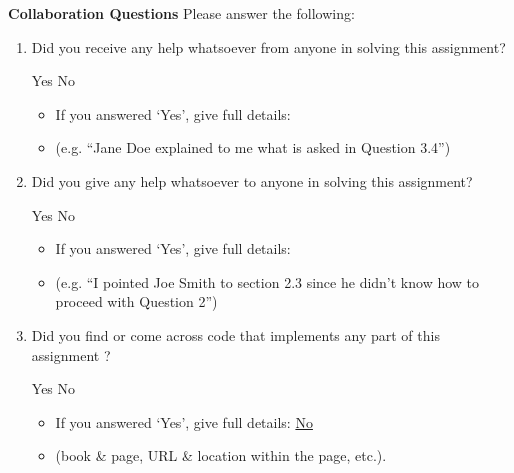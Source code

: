 \documentclass[11pt,addpoints,answers]{exam}
\numberwithin{equation}{section} %
\numberwithin{figure}{section} %
\numberwithin{table}{section} %
\begin{document}
\clearpage

\textbf{Collaboration Questions} Please answer the following:

\begin{enumerate}
    \item Did you receive any help whatsoever from anyone in solving this assignment?
    \begin{checkboxes}
     \choice Yes
     \CorrectChoice No
    \end{checkboxes}
    \begin{itemize}
        \item If you answered `Yes', give full details:
        \item (e.g. “Jane Doe explained to me what is asked in Question 3.4”)
    \end{itemize}

    \begin{tcolorbox}[fit,height=3cm,blank, borderline={1pt}{-2pt},nobeforeafter]
    \end{tcolorbox}

    \item Did you give any help whatsoever to anyone in solving this assignment?
    \begin{checkboxes}
     \choice Yes
     \CorrectChoice No
    \end{checkboxes}
    \begin{itemize}
        \item If you answered `Yes', give full details:
        \item (e.g. “I pointed Joe Smith to section 2.3 since he didn’t know how to proceed with Question 2”)
    \end{itemize}

    \begin{tcolorbox}[fit,height=3cm,blank, borderline={1pt}{-2pt},nobeforeafter]
    \end{tcolorbox}

    \item Did you find or come across code that implements any part of this assignment ? 
    \begin{checkboxes}
     \choice Yes
     \CorrectChoice No
    \end{checkboxes}
    \begin{itemize}
        \item If you answered `Yes', give full details: \underline{No}
        \item (book \& page, URL \& location within the page, etc.).
    \end{itemize}
    \begin{tcolorbox}[fit,height=3cm,blank, borderline={1pt}{-2pt},nobeforeafter]
    \end{tcolorbox}
\end{enumerate}
\end{document}
